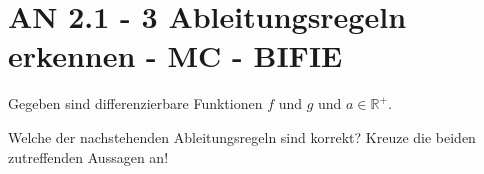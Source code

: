 \section{AN 2.1 - 3 Ableitungsregeln erkennen - MC - BIFIE}

\begin{beispiel}[AN 2.1]{1} %
				Gegeben sind differenzierbare Funktionen $f$ und $g$ und $a\in\mathbb{R^+}$.

Welche der nachstehenden Ableitungsregeln sind korrekt?
Kreuze die beiden zutreffenden Aussagen an!

\end{beispiel}
